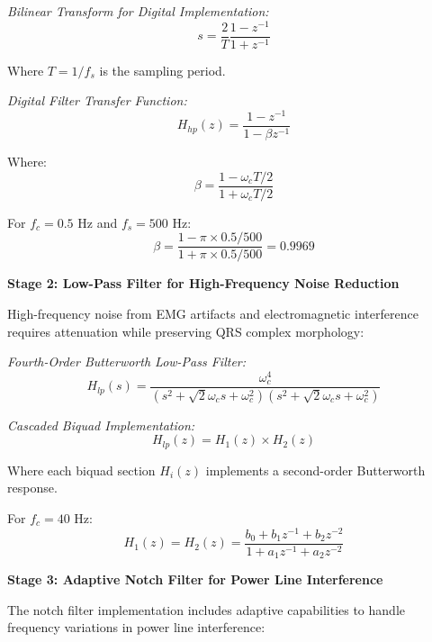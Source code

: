 \documentclass[12pt,a4paper]{article}
\begin{document}
\textit{Bilinear Transform for Digital Implementation:}
\begin{equation*}
s = \frac{2}{T}\frac{1-z^{-1}}{1+z^{-1}}
\end{equation*}

Where $T = 1/f_s$ is the sampling period.

\textit{Digital Filter Transfer Function:}
\begin{equation*}
H_{hp}(z) = \frac{1-z^{-1}}{1-\beta z^{-1}}
\end{equation*}

Where:
\begin{equation*}
\beta = \frac{1-\omega_c T/2}{1+\omega_c T/2}
\end{equation*}

For $f_c = 0.5$ Hz and $f_s = 500$ Hz:
\begin{equation*}
\beta = \frac{1-\pi \times 0.5/500}{1+\pi \times 0.5/500} = 0.9969
\end{equation*}

\vspace{0.5cm}

\textbf{Stage 2: Low-Pass Filter for High-Frequency Noise Reduction}

High-frequency noise from EMG artifacts and electromagnetic interference requires attenuation while preserving QRS complex morphology:

\textit{Fourth-Order Butterworth Low-Pass Filter:}
\begin{equation*}
H_{lp}(s) = \frac{\omega_c^4}{(s^2 + \sqrt{2}\omega_c s + \omega_c^2)(s^2 + \sqrt{2}\omega_c s + \omega_c^2)}
\end{equation*}

\textit{Cascaded Biquad Implementation:}
\begin{equation*}
H_{lp}(z) = H_1(z) \times H_2(z)
\end{equation*}

Where each biquad section $H_i(z)$ implements a second-order Butterworth response.

For $f_c = 40$ Hz:
\begin{equation*}
H_1(z) = H_2(z) = \frac{b_0 + b_1 z^{-1} + b_2 z^{-2}}{1 + a_1 z^{-1} + a_2 z^{-2}}
\end{equation*}

\vspace{0.5cm}

\textbf{Stage 3: Adaptive Notch Filter for Power Line Interference}

The notch filter implementation includes adaptive capabilities to handle frequency variations in power line interference:
\end{document}
